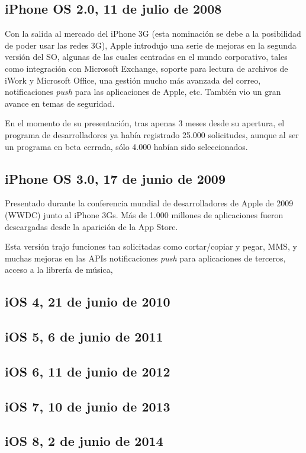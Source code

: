 \subsection{iPhone OS 2.0, 11 de julio de 2008}
Con la salida al mercado del iPhone 3G (esta nominación se debe a la posibilidad de poder usar las redes 3G), Apple introdujo una serie de mejoras en la segunda versión del SO, algunas de las cuales centradas en el mundo corporativo, tales como integración con Microsoft Exchange, soporte para lectura de archivos de iWork y Microsoft Office, una gestión mucho más avanzada del correo, notificaciones \emph{push} para las aplicaciones de Apple, etc. También vio un gran avance en temas de seguridad.

En el momento de su presentación, tras apenas 3 meses desde su apertura, el programa de desarrolladores ya había registrado 25.000 solicitudes, aunque al ser un programa en beta cerrada, sólo 4.000 habían sido seleccionados.

\subsection{iPhone OS 3.0, 17 de junio de 2009}
Presentado durante la conferencia mundial de desarrolladores de Apple de 2009 (WWDC) junto al iPhone 3Gs. Más de 1.000 millones de aplicaciones fueron descargadas desde la aparición de la App Store.

Esta versión trajo funciones tan solicitadas como cortar/copiar y pegar, MMS, y muchas mejoras en las APIs notificaciones \emph{push} para aplicaciones de terceros, acceso a la librería de música, 

\subsection{iOS 4, 21 de junio de 2010}

\subsection{iOS 5, 6 de junio de 2011}

\subsection{iOS 6, 11 de junio de 2012}

\subsection{iOS 7, 10 de junio de 2013}

\subsection{iOS 8, 2 de junio de 2014}

\chapterend